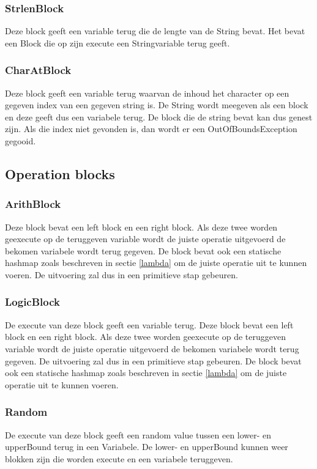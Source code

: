 \documentclass[]{article}
\begin{document}
\subsubsection{StrlenBlock}
Deze block geeft een variable terug die de lengte van de String bevat. Het bevat een Block die op zijn execute een Stringvariable terug geeft.
\subsubsection{CharAtBlock} 
Deze block geeft een variable terug waarvan de inhoud het character op een gegeven index van een gegeven string is. De String wordt meegeven als een block en deze geeft dus een variabele terug. De block die de string bevat kan dus genest zijn. Als die index niet gevonden is, dan wordt er een OutOfBoundsException gegooid.

\subsection{Operation blocks}
\subsubsection{ArithBlock}
Deze block bevat een left block en een right block. Als deze twee worden geexecute op de teruggeven variable wordt de juiste operatie uitgevoerd de bekomen variabele wordt terug gegeven. De block bevat ook een statische hashmap zoals beschreven in sectie \ref{lambda} om de juiste operatie uit te kunnen voeren.
De uitvoering zal dus in een primitieve stap gebeuren.
\subsubsection{LogicBlock}
De execute van deze block geeft een variable terug. Deze block bevat een left block en een right block. Als deze twee worden geexecute op de teruggeven variable wordt de juiste operatie uitgevoerd de bekomen variabele wordt terug gegeven.
De uitvoering zal dus in een primitieve stap gebeuren. De block bevat ook een statische hashmap zoals beschreven in sectie \ref{lambda} om de juiste operatie uit te kunnen voeren.
\subsubsection{Random}
De execute van deze block geeft een random value tussen een lower- en upperBound terug in een Variabele. De lower- en upperBound kunnen weer blokken zijn die worden execute en een variabele teruggeven.
\end{document}
